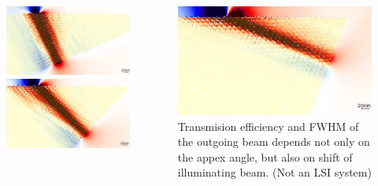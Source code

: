 \documentclass{beamer}
\begin{document}
\begin{frame}[t]
	\begin{columns}
		\begin{column}{0.5\textwidth}
			\begin{figure}
				\includegraphics[width=\textwidth]{../images/multilayer/prism04.png} \\
				\includegraphics[width=\textwidth]{../images/multilayer/prism08.png} \\
			\end{figure}
		\end{column}
		\begin{column}{0.5\textwidth}
				\includegraphics[width=\textwidth]{../images/multilayer/prism12.png}\\
				Transmision efficiency and FWHM of the outgoing beam depends not only on the appex angle, but also on shift of illuminating beam. (Not an LSI system)
	

\end{column}
\end{columns}
\end{frame}
\end{document}
